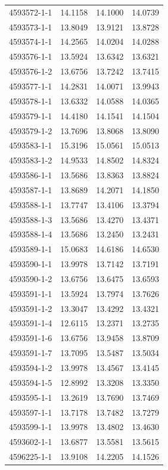 \begin{longtable}{lrrr}
4593572-1-1 & 14.1158 & 14.1000 & 14.0739 \\
4593573-1-1 & 13.8049 & 13.9121 & 13.8728 \\
4593574-1-1 & 14.2565 & 14.0204 & 14.0288 \\
4593576-1-1 & 13.5924 & 13.6342 & 13.6321 \\
4593576-1-2 & 13.6756 & 13.7242 & 13.7415 \\
4593577-1-1 & 14.2831 & 14.0071 & 13.9943 \\
4593578-1-1 & 13.6332 & 14.0588 & 14.0365 \\
4593579-1-1 & 14.4180 & 14.1541 & 14.1504 \\
4593579-1-2 & 13.7696 & 13.8068 & 13.8090 \\
4593583-1-1 & 15.3196 & 15.0561 & 15.0513 \\
4593583-1-2 & 14.9533 & 14.8502 & 14.8324 \\
4593586-1-1 & 13.5686 & 13.8363 & 13.8824 \\
4593587-1-1 & 13.8689 & 14.2071 & 14.1850 \\
4593588-1-1 & 13.7747 & 13.4106 & 13.3794 \\
4593588-1-3 & 13.5686 & 13.4270 & 13.4371 \\
4593588-1-4 & 13.5686 & 13.2450 & 13.2431 \\
4593589-1-1 & 15.0683 & 14.6186 & 14.6530 \\
4593590-1-1 & 13.9978 & 13.7142 & 13.7191 \\
4593590-1-2 & 13.6756 & 13.6475 & 13.6593 \\
4593591-1-1 & 13.5924 & 13.7974 & 13.7626 \\
4593591-1-2 & 13.3047 & 13.4292 & 13.4321 \\
4593591-1-4 & 12.6115 & 13.2371 & 13.2735 \\
4593591-1-6 & 13.6756 & 13.9458 & 13.8709 \\
4593591-1-7 & 13.7095 & 13.5487 & 13.5034 \\
4593594-1-2 & 13.9978 & 13.4567 & 13.4145 \\
4593594-1-5 & 12.8992 & 13.3208 & 13.3350 \\
4593595-1-1 & 13.2619 & 13.7690 & 13.7469 \\
4593597-1-1 & 13.7178 & 13.7482 & 13.7279 \\
4593599-1-1 & 13.9978 & 13.4802 & 13.4630 \\
4593602-1-1 & 13.6877 & 13.5581 & 13.5615 \\
4596225-1-1 & 13.9108 & 14.2205 & 14.1526 \\

\end{longtable}
